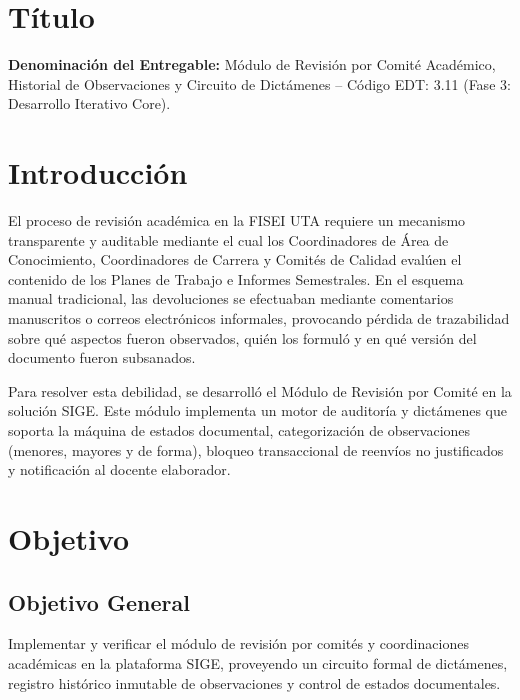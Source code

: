 \documentclass[12pt,a4paper]{article}
\begin{document}

\vspace{0.25cm}

\section{Título}
\textbf{Denominación del Entregable:} Módulo de Revisión por Comité Académico, Historial de Observaciones y Circuito de Dictámenes -- Código EDT: 3.11 (Fase 3: Desarrollo Iterativo Core).

\section{Introducción}
El proceso de revisión académica en la FISEI UTA requiere un mecanismo transparente y auditable mediante el cual los Coordinadores de Área de Conocimiento, Coordinadores de Carrera y Comités de Calidad evalúen el contenido de los Planes de Trabajo e Informes Semestrales. En el esquema manual tradicional, las devoluciones se efectuaban mediante comentarios manuscritos o correos electrónicos informales, provocando pérdida de trazabilidad sobre qué aspectos fueron observados, quién los formuló y en qué versión del documento fueron subsanados.

Para resolver esta debilidad, se desarrolló el Módulo de Revisión por Comité en la solución SIGE. Este módulo implementa un motor de auditoría y dictámenes que soporta la máquina de estados documental, categorización de observaciones (menores, mayores y de forma), bloqueo transaccional de reenvíos no justificados y notificación al docente elaborador.

\section{Objetivo}

\subsection{Objetivo General}
Implementar y verificar el módulo de revisión por comités y coordinaciones académicas en la plataforma SIGE, proveyendo un circuito formal de dictámenes, registro histórico inmutable de observaciones y control de estados documentales.
\end{document}
